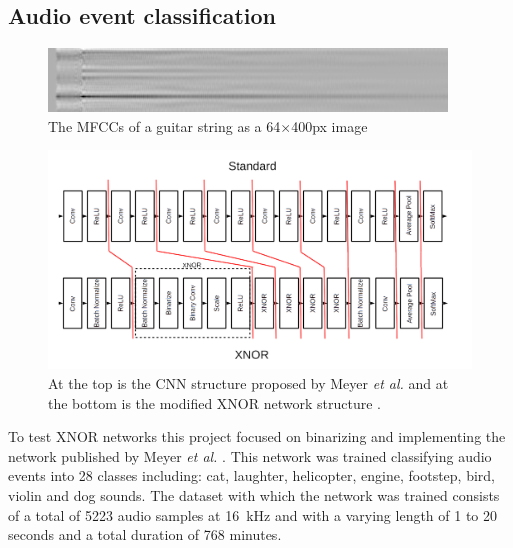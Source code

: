 \documentclass[conference]{IEEEtran}
\begin{document}
\subsection{Audio event classification}

\begin{figure}[!t]
\centering
\includegraphics[width=\columnwidth]{mfcc}
\caption{The MFCCs of a guitar string as a 64$\times$400px image}
\label{fig:mfcc}
\end{figure}

\begin{figure}[!t]
\centering
\includegraphics[width=\textwidth]{nn-full}
\caption{At the top is the CNN structure proposed by Meyer \textit{et al.} and at the bottom is the modified XNOR network structure \cite{lukas}.}
\label{fig:nn-full}
\end{figure}

To test XNOR networks this project focused on binarizing and implementing the network published by Meyer \textit{et al.} \cite{lukas}. This network was trained classifying audio events into 28 classes including: cat, laughter, helicopter, engine, footstep, bird, violin and dog sounds. The dataset with which the network was trained consists of a total of 5223 audio samples at \SI{16}{\kilo\hertz} and with a varying length of 1 to 20 seconds and a total duration of 768 minutes.
\end{document}
